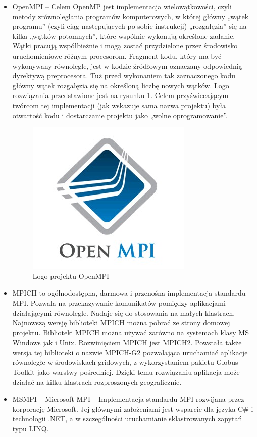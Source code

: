\documentclass[10pt,a4paper,titlepage,twoside]{report}
\begin{document}
\begin{itemize}
	\item OpenMPI – Celem OpenMP jest implementacja wielowątkowości, czyli metody zrównoleglania programów komputerowych, w której główny „wątek programu” (czyli ciąg następujących po sobie instrukcji) „rozgałęzia” się na kilka „wątków potomnych”, które wspólnie wykonują określone zadanie. Wątki pracują współbieżnie i mogą zostać przydzielone przez środowisko uruchomieniowe różnym procesorom. Fragment kodu, który ma być wykonywany równolegle, jest w kodzie źródłowym oznaczany odpowiednią dyrektywą preprocesora. Tuż przed wykonaniem tak zaznaczonego kodu główny wątek rozgałęzia się na określoną liczbę nowych wątków. Logo rozwiązania przedstawione jest na rysunku \ref{mpi_logo}. Celem przyświecającym twórcom tej implementacji (jak wskazuje sama nazwa projektu) była otwartość kodu i dostarczanie projektu jako „wolne oprogramowanie”.
	\begin{figure}[ht!]
		\centering
		\includegraphics[scale=0.7]{pics/mpi.jpg}
		\caption{Logo projektu OpenMPI}
		\label{mpi_logo}
	\end{figure}
	\item MPICH to ogólnodostępna, darmowa i przenośna implementacja standardu MPI. Pozwala na przekazywanie komunikatów pomiędzy aplikacjami działającymi równolegle. Nadaje się do stosowania na małych klastrach. Najnowszą wersję biblioteki MPICH można pobrać ze strony domowej projektu. Biblioteki MPICH można używać zarówno na systemach klasy MS Windows jak i Unix. Rozwinięciem MPICH jest MPICH2. Powstała także wersja tej biblioteki o nazwie MPICH-G2 pozwalająca uruchamiać aplikacje równoległe w środowiskach gridowych, z wykorzystaniem pakietu Globus Toolkit jako warstwy pośredniej. Dzięki temu rozwiązaniu aplikacja może działać na kilku klastrach rozproszonych geograficznie.
	\item MSMPI – Microsoft MPI – Implementacja standardu MPI rozwijana przez korporację Microsoft. Jej głównymi założeniami jest wsparcie dla języka C\# i technologii .NET, a w szczególności uruchamianie sklastrowanych zapytań typu LINQ.
\end{itemize}
\end{document}
